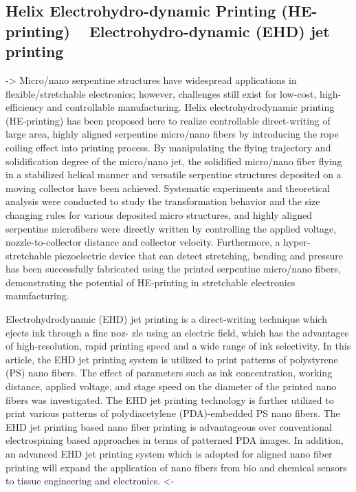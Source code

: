 \documentclass[5p,,preprint,12pt,twocolumn]{elsarticle}
\begin{document}
\subsection{Helix Electrohydro-dynamic Printing (HE-printing) \unskip~\protect\cite{527120:11974308} \mbox{}\protect\newline Electrohydro-dynamic (EHD) jet printing \unskip~\protect\cite{527120:11974320}}-{\textgreater} Micro/nano serpentine structures have widespread applications in flexible/stretchable electronics; however, challenges still exist for low-cost, high-efficiency and controllable manufacturing. Helix electrohydrodynamic printing (HE-printing) has been proposed here to realize controllable direct-writing of large area, highly aligned serpentine micro/nano fibers by introducing the rope coiling effect into printing process. By manipulating the flying trajectory and solidification degree of the micro/nano jet, the solidified micro/nano fiber flying in a stabilized helical manner and versatile serpentine structures deposited on a moving collector have been achieved. Systematic experiments and theoretical analysis were conducted to study the transformation behavior and the size changing rules for various deposited micro structures, and highly aligned serpentine microfibers were directly written by controlling the applied voltage, nozzle-to-collector distance and collector velocity. Furthermore, a hyper-stretchable piezoelectric device that can detect stretching, bending and pressure has been successfully fabricated using the printed serpentine micro/nano fibers, demonstrating the potential of HE-printing in stretchable electronics manufacturing.

Electrohydrodynamic (EHD) jet printing is a direct-writing technique which ejects ink through a fine noz- zle using an electric field, which has the advantages of high-resolution, rapid printing speed and a wide range of ink selectivity. In this article, the EHD jet printing system is utilized to print patterns of polystyrene (PS) nano fibers. The effect of parameters such as ink concentration, working distance, applied voltage, and stage speed on the diameter of the printed nano fibers was investigated. The EHD jet printing technology is further utilized to print various patterns of polydiacetylene (PDA)-embedded PS nano fibers. The EHD jet printing based nano fiber printing is advantageous over conventional electrospining based approaches in terms of patterned PDA images. In addition, an advanced EHD jet printing system which is adopted for aligned nano fiber printing will expand the application of nano fibers from bio and chemical sensors to tissue engineering and electronics. {\textless}-
\end{document}
